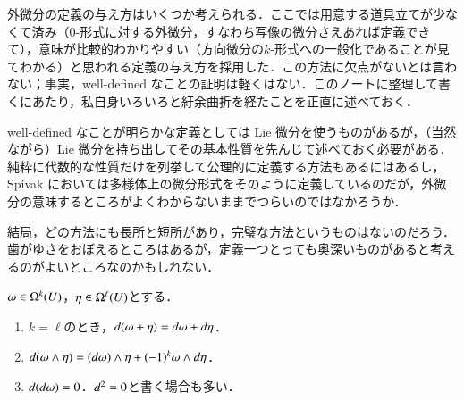 \begin{dig}
外微分の定義の与え方はいくつか考えられる．ここでは用意する道具立てが少なくて済み（0-形式に対する外微分，すなわち写像の微分さえあれば定義できて），意味が比較的わかりやすい（方向微分の$k$-形式への一般化であることが見てわかる）と思われる定義の与え方を採用した．この方法に欠点がないとは言わない；事実，well-defined なことの証明は軽くはない．このノートに整理して書くにあたり，私自身いろいろと紆余曲折を経たことを正直に述べておく．

well-defined なことが明らかな定義としては Lie 微分を使うものがあるが，（当然ながら）Lie 微分を持ち出してその基本性質を先んじて述べておく必要がある．純粋に代数的な性質だけを列挙して公理的に定義する方法もあるにはあるし，Spivak においては多様体上の微分形式をそのように定義しているのだが，外微分の意味するところがよくわからないままでつらいのではなかろうか．

結局，どの方法にも長所と短所があり，完璧な方法というものはないのだろう．歯がゆさをおぼえるところはあるが，定義一つとっても奥深いものがあると考えるのがよいところなのかもしれない．
\end{dig}

\begin{prop}[外微分の基本性質] $\omega \in \Omega^k(U)$，$\eta \in \Omega^\ell(U)$とする．
\begin{enumerate}
\item $k=\ell$のとき，$\mathop{}\!d (\omega + \eta) = \mathop{}\!d \omega + \mathop{}\!d \eta$．
\item $\mathop{}\!d (\omega \wedge \eta) = (\mathop{}\!d \omega) \wedge \eta + (-1)^k \omega \wedge \mathop{}\!d \eta$．
\item $\mathop{}\!d (\mathop{}\!d \omega) = 0$．$\mathop{}\!d^2 = 0$と書く場合も多い．
\end{enumerate}
\end{prop}


